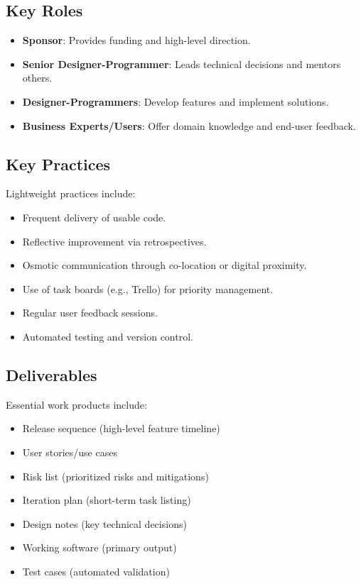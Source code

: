 \subsection*{Key Roles}
\begin{itemize}
    \item \textbf{Sponsor}: Provides funding and high-level direction.
    \item \textbf{Senior Designer-Programmer}: Leads technical decisions and mentors others.
    \item \textbf{Designer-Programmers}: Develop features and implement solutions.
    \item \textbf{Business Experts/Users}: Offer domain knowledge and end-user feedback.
\end{itemize}

\subsection*{Key Practices}
Lightweight practices include:
\begin{itemize}
    \item Frequent delivery of usable code.
    \item Reflective improvement via retrospectives.
    \item Osmotic communication through co-location or digital proximity.
    \item Use of task boards (e.g., Trello) for priority management.
    \item Regular user feedback sessions.
    \item Automated testing and version control.
\end{itemize}

\subsection*{Deliverables}
Essential work products include:
\begin{itemize}
    \item Release sequence (high-level feature timeline)
    \item User stories/use cases
    \item Risk list (prioritized risks and mitigations)
    \item Iteration plan (short-term task listing)
    \item Design notes (key technical decisions)
    \item Working software (primary output)
    \item Test cases (automated validation)
\end{itemize}

